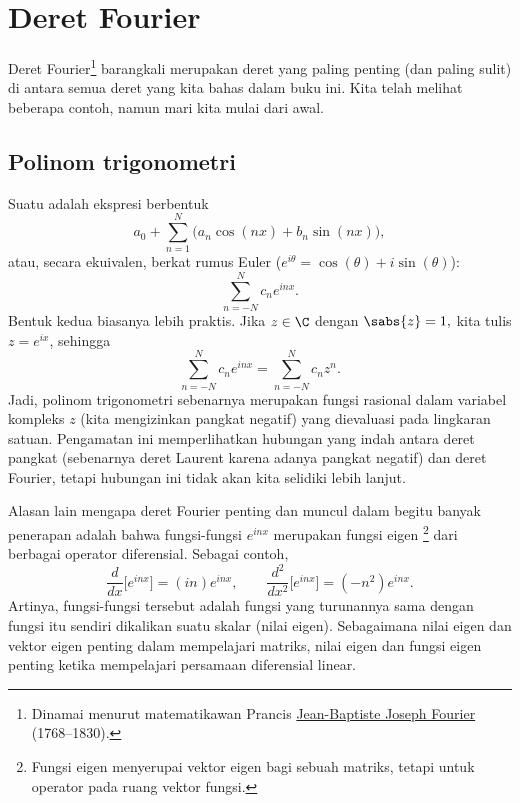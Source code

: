 
\sectionnewpage
\section{Deret Fourier}
\label{sec:fourier}



Deret Fourier\footnote{%
Dinamai menurut matematikawan Prancis
\href{https://en.wikipedia.org/wiki/Joseph_Fourier}{Jean-Baptiste Joseph Fourier}
(1768--1830).} barangkali merupakan deret yang paling penting (dan paling sulit)
di antara semua deret yang kita bahas dalam
buku ini.  Kita telah melihat beberapa contoh,
namun mari kita mulai
dari awal.

\subsection{Polinom trigonometri}

Suatu \emph{} adalah ekspresi berbentuk
\begin{equation*}
a_0 + \sum_{n=1}^N \bigl(a_n \cos(nx) + b_n \sin(nx) \bigr),
\end{equation*}
atau, secara ekuivalen, berkat rumus Euler ($e^{i\theta} = \cos(\theta) + i
\sin(\theta)$):
\begin{equation*}
\sum_{n=-N}^N c_n e^{inx} .
\end{equation*}
Bentuk kedua biasanya lebih praktis.  Jika
$z \in \C$ dengan $\sabs{z}=1,$ kita tulis $z = e^{ix}$, sehingga
\begin{equation*}
\sum_{n=-N}^N c_n e^{inx} = 
\sum_{n=-N}^N c_n z^n .
\end{equation*}
Jadi, polinom trigonometri sebenarnya merupakan fungsi rasional
dalam variabel kompleks $z$
(kita mengizinkan pangkat negatif) yang dievaluasi pada lingkaran satuan.
Pengamatan ini memperlihatkan hubungan yang indah antara deret pangkat
(sebenarnya deret Laurent karena adanya pangkat negatif) dan
deret Fourier,
tetapi hubungan ini tidak akan kita selidiki lebih lanjut.

\medskip

Alasan lain mengapa deret Fourier penting dan muncul dalam begitu banyak
penerapan adalah bahwa fungsi-fungsi $e^{inx}$ merupakan fungsi eigen%
\footnote{Fungsi eigen menyerupai vektor eigen bagi sebuah matriks, tetapi untuk
operator pada ruang vektor fungsi.} dari berbagai
operator diferensial.  Sebagai contoh,
\begin{equation*}
\frac{d}{dx} \bigl[ e^{inx} \bigr] = (in) e^{inx}, \qquad
\frac{d^2}{dx^2} \bigl[ e^{inx} \bigr] = (-n^2) e^{inx} .
\end{equation*}
Artinya, fungsi-fungsi tersebut adalah fungsi yang turunannya sama dengan
fungsi itu sendiri dikalikan suatu skalar (nilai eigen).
Sebagaimana nilai eigen dan vektor eigen penting dalam mempelajari matriks,
nilai eigen dan fungsi eigen penting ketika mempelajari persamaan
diferensial linear.

